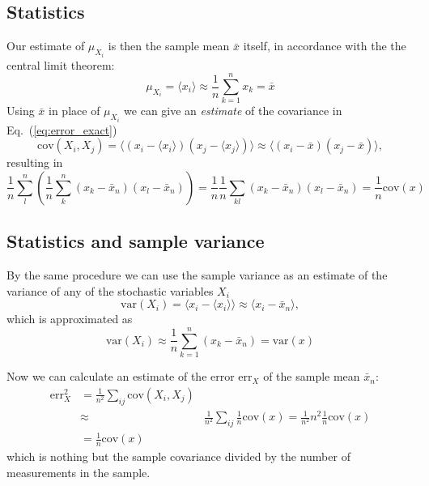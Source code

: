 \documentclass[%
oneside,                 %
final,                   %
10pt]{article}
\begin{document}
\subsection{Statistics}
\begin{block}{}
Our estimate of $\mu_{X_i}^{\phantom X}$ is then the sample mean $\bar x$
itself, in accordance with the the central limit theorem:
\[
\mu_{X_i}^{\phantom X} = \langle x_i\rangle \approx \frac{1}{n}\sum_{k=1}^n x_k = \bar x
\]
Using $\bar x$ in place of $\mu_{X_i}^{\phantom X}$ we can give an
\emph{estimate} of the covariance in Eq.~(\ref{eq:error_exact})
\[
\mathrm{cov}(X_i, X_j) = \langle (x_i-\langle x_i\rangle)(x_j-\langle x_j\rangle)\rangle
\approx\langle (x_i - \bar x)(x_j - \bar{x})\rangle,
\]
resulting in
\[ 
\frac{1}{n} \sum_{l}^n \left(\frac{1}{n}\sum_{k}^n (x_k -\bar x_n)(x_l - \bar x_n)\right)=\frac{1}{n}\frac{1}{n} \sum_{kl} (x_k -\bar x_n)(x_l - \bar x_n)=\frac{1}{n}\mathrm{cov}(x)
\]
\end{block}

\subsection{Statistics and sample variance}
\begin{block}{}
By the same procedure we can use the sample variance as an
estimate of the variance of any of the stochastic variables $X_i$
\[
\mathrm{var}(X_i)=\langle x_i - \langle x_i\rangle\rangle \approx \langle x_i - \bar x_n\rangle\nonumber,
\]
which is approximated as 
\begin{equation}
\mathrm{var}(X_i)\approx \frac{1}{n}\sum_{k=1}^n (x_k - \bar x_n)=\mathrm{var}(x)
\label{eq:var_estimate_i_think}
\end{equation}

Now we can calculate an estimate of the error
$\mathrm{err}_X^{\phantom X}$ of the sample mean $\bar x_n$:
\begin{align}
\mathrm{err}_X^2
&=\frac{1}{n^2}\sum_{ij} \mathrm{cov}(X_i, X_j) \nonumber \\
&\approx&\frac{1}{n^2}\sum_{ij}\frac{1}{n}\mathrm{cov}(x) =\frac{1}{n^2}n^2\frac{1}{n}\mathrm{cov}(x)\nonumber\\
&=\frac{1}{n}\mathrm{cov}(x)
\label{eq:error_estimate}
\end{align}
which is nothing but the sample covariance divided by the number of
measurements in the sample.
\end{block}

\end{document}
